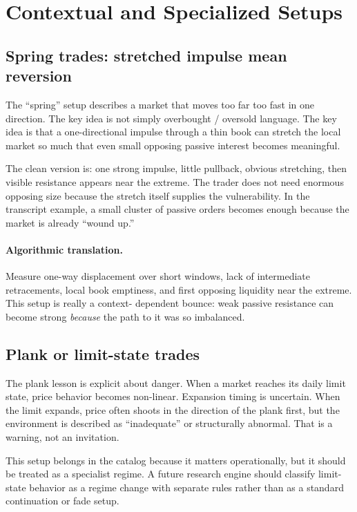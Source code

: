 \section{Contextual and Specialized Setups}

\subsection{Spring trades: stretched impulse mean reversion}

The ``spring'' setup describes a market that moves too far too fast in one direction. The key
idea is not simply overbought / oversold language. The key idea is that a one-directional
impulse through a thin book can stretch the local market so much that even small opposing
passive interest becomes meaningful.

The clean version is: one strong impulse, little pullback, obvious stretching, then visible
resistance appears near the extreme. The trader does not need enormous opposing size because
the stretch itself supplies the vulnerability. In the transcript example, a small cluster of
passive orders becomes enough because the market is already ``wound up.''

\paragraph{Algorithmic translation.}
Measure one-way displacement over short windows, lack of intermediate retracements, local book
emptiness, and first opposing liquidity near the extreme. This setup is really a context-
dependent bounce: weak passive resistance can become strong \emph{because} the path to it was so
imbalanced.

\subsection{Plank or limit-state trades}

The plank lesson is explicit about danger. When a market reaches its daily limit state, price
behavior becomes non-linear. Expansion timing is uncertain. When the limit expands, price often
shoots in the direction of the plank first, but the environment is described as ``inadequate''
or structurally abnormal. That is a warning, not an invitation.

This setup belongs in the catalog because it matters operationally, but it should be treated as
a specialist regime. A future research engine should classify limit-state behavior as a regime
change with separate rules rather than as a standard continuation or fade setup.

